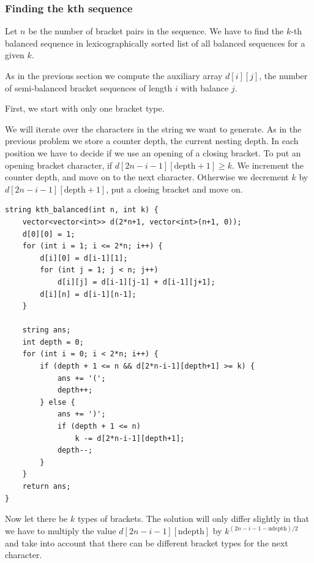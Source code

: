 \documentclass[8pt, a4paper, oneside, twocolumn]{extarticle}
\begin{document}
\subsubsection{Finding the kth sequence}
Let $n$ be the number of bracket pairs in the sequence. We have to find the $k$-th balanced sequence in lexicographically sorted list of all balanced sequences for a given $k$.

As in the previous section we compute the auxiliary array $d[i][j]$, the number of semi-balanced bracket sequences of length $i$ with balance $j$.

First, we start with only one bracket type.

We will iterate over the characters in the string we want to generate. As in the previous problem we store a counter $\text{depth}$, the current nesting depth. In each position we have to decide if we use an opening of a closing bracket. To put an opening bracket character, if $d[2n - i - 1][\text{depth}+1] \ge k$. We increment the counter $\text{depth}$, and move on to the next character. Otherwise we decrement $k$ by $d[2n - i - 1][\text{depth}+1]$, put a closing bracket and move on.
\begin{verbatim}
string kth_balanced(int n, int k) {
    vector<vector<int>> d(2*n+1, vector<int>(n+1, 0));
    d[0][0] = 1;
    for (int i = 1; i <= 2*n; i++) {
        d[i][0] = d[i-1][1];
        for (int j = 1; j < n; j++)
            d[i][j] = d[i-1][j-1] + d[i-1][j+1];
        d[i][n] = d[i-1][n-1];
    }

    string ans;
    int depth = 0;
    for (int i = 0; i < 2*n; i++) {
        if (depth + 1 <= n && d[2*n-i-1][depth+1] >= k) {
            ans += '(';
            depth++;
        } else {
            ans += ')';
            if (depth + 1 <= n)
                k -= d[2*n-i-1][depth+1];
            depth--;
        }
    }
    return ans;
}
\end{verbatim}
Now let there be $k$ types of brackets. The solution will only differ slightly in that we have to multiply the value $d[2n-i-1][\text{ndepth}]$ by $k^{(2n-i-1-\text{ndepth})/2}$ and take into account that there can be different bracket types for the next character.
\end{document}

